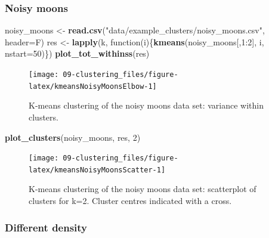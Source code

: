 \documentclass[]{book}
\newenvironment{Shaded}{\begin{snugshade}}{\end{snugshade}}
\newcommand{\KeywordTok}[1]{\textcolor[rgb]{0.13,0.29,0.53}{\textbf{{#1}}}}
\newcommand{\DataTypeTok}[1]{\textcolor[rgb]{0.13,0.29,0.53}{{#1}}}
\newcommand{\DecValTok}[1]{\textcolor[rgb]{0.00,0.00,0.81}{{#1}}}
\newcommand{\StringTok}[1]{\textcolor[rgb]{0.31,0.60,0.02}{{#1}}}
\newcommand{\NormalTok}[1]{{#1}}
\theoremstyle{definition}
\theoremstyle{definition}
\theoremstyle{definition}
\theoremstyle{remark}
\begin{document}
\subsubsection{Noisy moons}\label{noisy-moons}

\begin{Shaded}
\begin{Highlighting}[]
\NormalTok{noisy_moons <-}\StringTok{ }\KeywordTok{read.csv}\NormalTok{(}\StringTok{"data/example_clusters/noisy_moons.csv"}\NormalTok{, }\DataTypeTok{header=}\NormalTok{F)}
\NormalTok{res <-}\StringTok{ }\KeywordTok{lapply}\NormalTok{(k, function(i)\{}\KeywordTok{kmeans}\NormalTok{(noisy_moons[,}\DecValTok{1}\NormalTok{:}\DecValTok{2}\NormalTok{], i, }\DataTypeTok{nstart=}\DecValTok{50}\NormalTok{)\})}
\KeywordTok{plot_tot_withinss}\NormalTok{(res)}
\end{Highlighting}
\end{Shaded}

\begin{figure}

{\centering \texttt{[image: 09-clustering\_files/figure-latex/kmeansNoisyMoonsElbow-1]} 

}

\caption{K-means clustering of the noisy moons data set: variance within clusters.}\label{fig:kmeansNoisyMoonsElbow}
\end{figure}

\begin{Shaded}
\begin{Highlighting}[]
\KeywordTok{plot_clusters}\NormalTok{(noisy_moons, res, }\DecValTok{2}\NormalTok{)}
\end{Highlighting}
\end{Shaded}

\begin{figure}

{\centering \texttt{[image: 09-clustering\_files/figure-latex/kmeansNoisyMoonsScatter-1]} 

}

\caption{K-means clustering of the noisy moons data set: scatterplot of clusters for k=2. Cluster centres indicated with a cross.}\label{fig:kmeansNoisyMoonsScatter}
\end{figure}

\subsubsection{Different density}\label{different-density}
\end{document}
